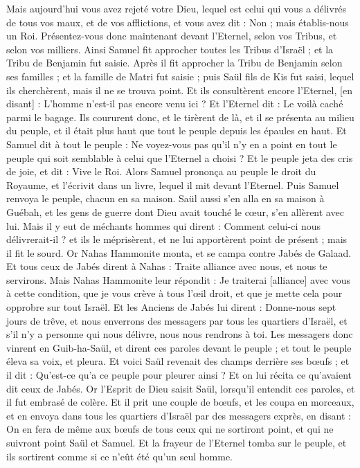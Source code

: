 \begin{multicols}{2}
Mais aujourd'hui vous avez rejeté votre Dieu, lequel est celui qui vous a délivrés de tous vos maux, et de vos afflictions, et vous avez dit : Non ; mais établis-nous un Roi. Présentez-vous donc maintenant devant l'Eternel, selon vos Tribus, et selon vos milliers.
Ainsi Samuel fit approcher toutes les Tribus d'Israël ; et la Tribu de Benjamin fut saisie.
Après il fit approcher la Tribu de Benjamin selon ses familles ; et la famille de Matri fut saisie ; puis Saül fils de Kis fut saisi, lequel ils cherchèrent, mais il ne se trouva point.
Et ils consultèrent encore l'Eternel, [en disant] : L'homme n'est-il pas encore venu ici ? Et l'Eternel dit : Le voilà caché parmi le bagage.
Ils coururent donc, et le tirèrent de là, et il se présenta au milieu du peuple, et il était plus haut que tout le peuple depuis les épaules en haut.
Et Samuel dit à tout le peuple : Ne voyez-vous pas qu'il n'y en a point en tout le peuple qui soit semblable à celui que l'Eternel a choisi ? Et le peuple jeta des cris de joie, et dit : Vive le Roi.
Alors Samuel prononça au peuple le droit du Royaume, et l'écrivit dans un livre, lequel il mit devant l'Eternel. Puis Samuel renvoya le peuple, chacun en sa maison.
Saül aussi s'en alla en sa maison à Guébah, et les gens de guerre dont Dieu avait touché le cœur, s'en allèrent avec lui.
Mais il y eut de méchants hommes qui dirent : Comment celui-ci nous délivrerait-il ? et ils le méprisèrent, et ne lui apportèrent point de présent ; mais il fit le sourd.
\VerseOne{}Or Nahas Hammonite monta, et se campa contre Jabés de Galaad. Et tous ceux de Jabés dirent à Nahas : Traite alliance avec nous, et nous te servirons.
Mais Nahas Hammonite leur répondit : Je traiterai [alliance] avec vous à cette condition, que je vous crève à tous l'œil droit, et que je mette cela pour opprobre sur tout Israël.
Et les Anciens de Jabés lui dirent : Donne-nous sept jours de trêve, et nous enverrons des messagers par tous les quartiers d'Israël, et s'il n'y a personne qui nous délivre, nous nous rendrons à toi.
Les messagers donc vinrent en Guib-ha-Saül, et dirent ces paroles devant le peuple ; et tout le peuple éleva sa voix, et pleura.
Et voici Saül revenait des champs derrière ses bœufs ; et il dit : Qu'est-ce qu'a ce peuple pour pleurer ainsi ? Et on lui récita ce qu'avaient dit ceux de Jabés.
Or l'Esprit de Dieu saisit Saül, lorsqu'il entendit ces paroles, et il fut embrasé de colère.
Et il prit une couple de bœufs, et les coupa en morceaux, et en envoya dans tous les quartiers d'Israël par des messagers exprès, en disant : On en fera de même aux bœufs de tous ceux qui ne sortiront point, et qui ne suivront point Saül et Samuel. Et la frayeur de l'Eternel tomba sur le peuple, et ils sortirent comme si ce n'eût été qu'un seul homme.

\end{multicols}
